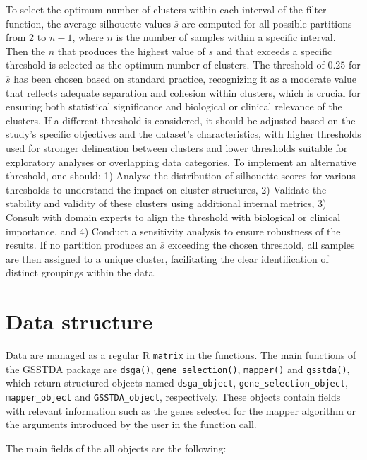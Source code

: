 To select the optimum number of clusters within each interval of the filter function, the average silhouette values \(\overline{s}\) are computed for all possible partitions from \(2\) to \(n-1\), where \(n\) is the number of samples within a specific interval. Then the \(n\) that produces the highest value of \(\overline{s}\) and that exceeds a specific threshold is selected as the optimum number of clusters. The threshold of \(0.25\) for \(\overline{s}\) has been chosen based on standard practice, recognizing it as a moderate value that reflects adequate separation and cohesion within clusters, which is crucial for ensuring both statistical significance and biological or clinical relevance of the clusters. If a different threshold is considered, it should be adjusted based on the study's specific objectives and the dataset's characteristics, with higher thresholds used for stronger delineation between clusters and lower thresholds suitable for exploratory analyses or overlapping data categories. To implement an alternative threshold, one should: 1) Analyze the distribution of silhouette scores for various thresholds to understand the impact on cluster structures, 2) Validate the stability and validity of these clusters using additional internal metrics, 3) Consult with domain experts to align the threshold with biological or clinical importance, and 4) Conduct a sensitivity analysis to ensure robustness of the results. If no partition produces an \(\overline{s}\) exceeding the chosen threshold, all samples are then assigned to a unique cluster, facilitating the clear identification of distinct groupings within the data.

\hypertarget{section3}{%
\section{Data structure}\label{section3}}

Data are managed as a regular R \texttt{matrix} in the  functions. The main functions of the GSSTDA package are \texttt{dsga()}, \texttt{gene\_selection()}, \texttt{mapper()} and \texttt{gsstda()}, which return structured objects named \texttt{dsga\_object}, \texttt{gene\_selection\_object}, \texttt{mapper\_object} and \texttt{GSSTDA\_object}, respectively. These objects contain fields with relevant information such as the genes selected for the mapper algorithm or the arguments introduced by the user in the function call.

The main fields of the all objects are the following:

